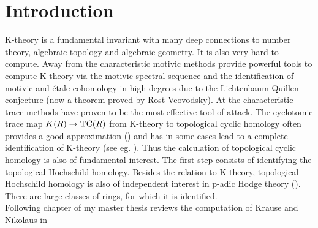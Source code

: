 \chapter*{Introduction}
K-theory is a fundamental invariant with many deep connections to number theory, algebraic topology and algebraic geometry. It is also very hard to compute. Away from the characteristic motivic methods provide powerful tools to compute K-theory via the motivic spectral sequence and the identification of motivic and étale cohomology in high degrees due to the Lichtenbaum-Quillen conjecture (now a theorem proved by Rost-Veovodsky). At the characteristic trace methods have proven to be the most effective tool of attack. 
The cyclotomic trace map $K(R)\rightarrow \operatorname{TC}(R)$ from K-theory to topological cyclic homology often provides a good approximation (\cite{HMWV}) and has in some cases lead to a complete identification of K-theory (see eg. \cite{HMlocalfields}). Thus the calculation of topological cyclic homology is also of fundamental interest. The first step consists of identifying the topological Hochschild homology. Besides the relation to K-theory, topological Hochschild homology is also of independent interest in p-adic Hodge theory (\cite{BMS2}). There are large classes of rings, for which it is identified. 
\\
Following chapter of my master thesis reviews the computation of Krause and Nikolaus in \cite{KN} 


